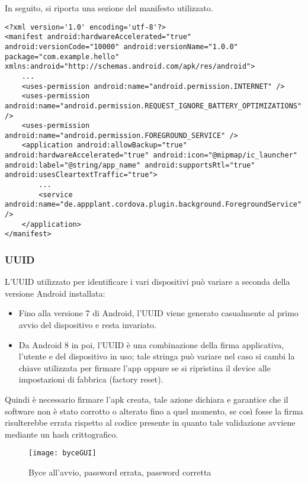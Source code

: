 \documentclass[target=bach]{thud}
\begin{document}
            In seguito, si riporta una sezione del manifesto utilizzato.
\begin{lstlisting}
<?xml version='1.0' encoding='utf-8'?>
<manifest android:hardwareAccelerated="true" android:versionCode="10000" android:versionName="1.0.0" package="com.example.hello" xmlns:android="http://schemas.android.com/apk/res/android">
    ...
    <uses-permission android:name="android.permission.INTERNET" />
    <uses-permission android:name="android.permission.REQUEST_IGNORE_BATTERY_OPTIMIZATIONS" />
    <uses-permission android:name="android.permission.FOREGROUND_SERVICE" />
    <application android:allowBackup="true" android:hardwareAccelerated="true" android:icon="@mipmap/ic_launcher" android:label="@string/app_name" android:supportsRtl="true" android:usesCleartextTraffic="true">
        ...
        <service android:name="de.appplant.cordova.plugin.background.ForegroundService" />
    </application>
</manifest>

\end{lstlisting}

        \subsubsection{UUID}
            L'UUID utilizzato per identificare i vari dispositivi può variare a seconda della versione Android installata:
            \begin{itemize}
                \setlength{\itemsep}{1pt}
                \item Fino alla versione 7 di Android, l'UUID viene generato casualmente al primo avvio del dispositivo e resta invariato.
                \item Da Android 8 in poi, l'UUID è una combinazione della firma applicativa, l'utente e del dispositivo in uso; tale stringa può variare nel caso si cambi la chiave utilizzata per firmare l'app oppure se si ripristina il device alle impostazioni di fabbrica (factory reset).
            \end{itemize}
            Quindi è necessario firmare l'apk creata, tale azione dichiara e garantice che il software non è stato corrotto o alterato fino a quel momento, se così fosse la firma risulterebbe errata rispetto al codice presente in quanto tale validazione avviene mediante un hash crittografico.\\


        \graphicspath{ {./img/} }
        \begin{figure}[h]
            \texttt{[image: byceGUI]}
            \caption{Byce all'avvio, password errata, password corretta}
            \label{fig:usecase}
            \centering
        \end{figure}
\end{document}
